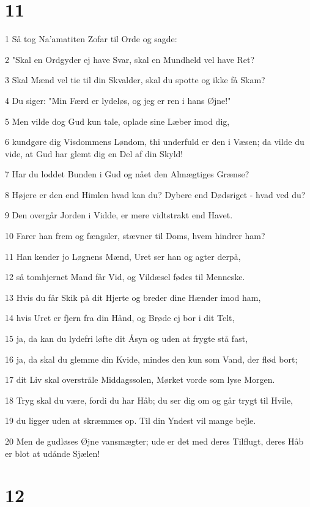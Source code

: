 \chapter{11}

\par 1 Så tog Na'amatiten Zofar til Orde og sagde:
\par 2 "Skal en Ordgyder ej have Svar, skal en Mundheld vel have Ret?
\par 3 Skal Mænd vel tie til din Skvalder, skal du spotte og ikke få Skam?
\par 4 Du siger: "Min Færd er lydeløs, og jeg er ren i hans Øjne!"
\par 5 Men vilde dog Gud kun tale, oplade sine Læber imod dig,
\par 6 kundgøre dig Visdommens Løndom, thi underfuld er den i Væsen; da vilde du vide, at Gud har glemt dig en Del af din Skyld!
\par 7 Har du loddet Bunden i Gud og nået den Almægtiges Grænse?
\par 8 Højere er den end Himlen hvad kan du? Dybere end Dødsriget - hvad ved du?
\par 9 Den overgår Jorden i Vidde, er mere vidtstrakt end Havet.
\par 10 Farer han frem og fængsler, stævner til Doms, hvem hindrer ham?
\par 11 Han kender jo Løgnens Mænd, Uret ser han og agter derpå,
\par 12 så tomhjernet Mand får Vid, og Vildæsel fødes til Menneske.
\par 13 Hvis du får Skik på dit Hjerte og breder dine Hænder imod ham,
\par 14 hvis Uret er fjern fra din Hånd, og Brøde ej bor i dit Telt,
\par 15 ja, da kan du lydefri løfte dit Åsyn og uden at frygte stå fast,
\par 16 ja, da skal du glemme din Kvide, mindes den kun som Vand, der flød bort;
\par 17 dit Liv skal overstråle Middagssolen, Mørket vorde som lyse Morgen.
\par 18 Tryg skal du være, fordi du har Håb; du ser dig om og går trygt til Hvile,
\par 19 du ligger uden at skræmmes op. Til din Yndest vil mange bejle.
\par 20 Men de gudløses Øjne vansmægter; ude er det med deres Tilflugt, deres Håb er blot at udånde Sjælen!

\chapter{12}

